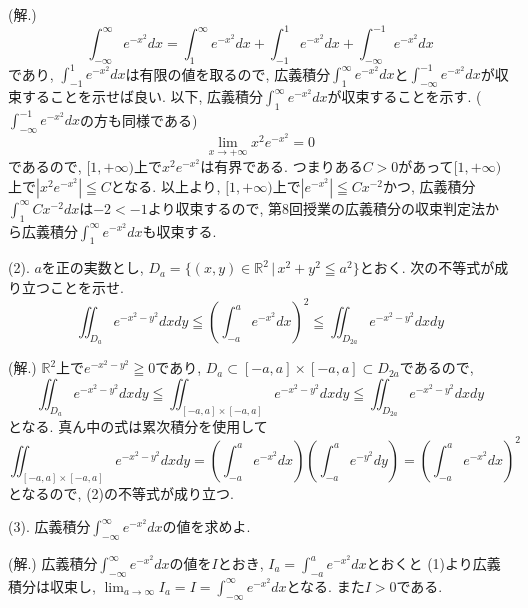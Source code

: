 \documentclass[dvipdfmx,a4paper,11pt]{article}
\newcommand{\R}{\mathbb{R}}
\theoremstyle{definition}
\begin{document}
\hspace{-11pt}(解.)
$$\int_{- \infty}^{\infty} e^{- x^2} dx = 
\int_{1}^{\infty} e^{- x^2} dx
+\int_{- 1}^{1} e^{- x^2} dx
+\int_{- \infty}^{-1} e^{- x^2} dx$$
であり, $\int_{- 1}^{1} e^{- x^2} dx$は有限の値を取るので, 
広義積分$\int_{1}^{\infty} e^{- x^2} dx$と$\int_{- \infty}^{-1} e^{- x^2} dx$が収束することを示せば良い.
以下, 広義積分$\int_{1}^{\infty} e^{- x^2} dx$が収束することを示す. ($\int_{- \infty}^{-1} e^{- x^2} dx$の方も同様である)
$$\lim_{x \rightarrow +\infty} x^2 e^{- x^2}=0$$
であるので, $[1, + \infty)$上で$x^2 e^{- x^2}$は有界である.
つまりある$C>0$があって$[1, + \infty)$上で$|x^2 e^{- x^2}| \leqq C $となる.
以上より, $[1, + \infty)$上で$|e^{- x^2}| \leqq  Cx^{-2}$かつ, 広義積分$\int_{1}^{\infty} Cx^{-2}dx$は$-2<-1$より収束するので, 第8回授業の広義積分の収束判定法から広義積分$\int_{1}^{\infty} e^{- x^2}dx$も収束する.
\vspace{7pt}


{\large(2). $a$を正の実数とし, $D_{a} = \{  (x,y) \in \R^2 \,|\,x^2 + y^2 \leqq a^2\}$とおく. 次の不等式が成り立つことを示せ.}
$$
\iint_{D_a} e^{-x^2 - y^2} dxdy \leqq \left(\int_{-a}^{a} e^{- x^2} dx  \right)^{2} \leqq \iint_{D_{2 a}} e^{-x^2 - y^2} dxdy 
$$
\vspace{7pt}

\hspace{-11pt}(解.)
$\R^2$上で$e^{-x^2 - y^2}\geqq0$であり, 
$D_{a} \subset [-a, a] \times [-a, a] \subset D_{2a}$であるので, 
$$
\iint_{D_a} e^{-x^2 - y^2} dxdy \leqq \iint_{[-a, a] \times [-a, a] } e^{-x^2 - y^2} dxdy \leqq \iint_{D_{2 a}} e^{-x^2 - y^2} dxdy 
$$
となる. 真ん中の式は累次積分を使用して
$$
\iint_{[-a, a] \times [-a, a] } e^{-x^2 - y^2} dxdy
= 
\left(\int_{-a}^{a} e^{- x^2} dx  \right)\left(\int_{-a}^{a} e^{- y^2} dy \right)
=
\left(\int_{-a}^{a} e^{- x^2} dx  \right)^{2}
$$
となるので, (2)の不等式が成り立つ.
\vspace{7pt}

{\large(3). 広義積分$\int_{-\infty}^{\infty} e^{- x^2} dx$の値を求めよ.}\vspace{7pt}

\hspace{-11pt}(解.)
広義積分$\int_{-\infty}^{\infty} e^{- x^2} dx$の値を$I$とおき, $I_a = \int_{-a}^{a} e^{- x^2} dx $とおくと
(1)より広義積分は収束し, $\lim_{a \rightarrow \infty} I_a = I =\int_{-\infty}^{\infty} e^{- x^2} dx$となる.
また$I>0$である. 
\end{document}
